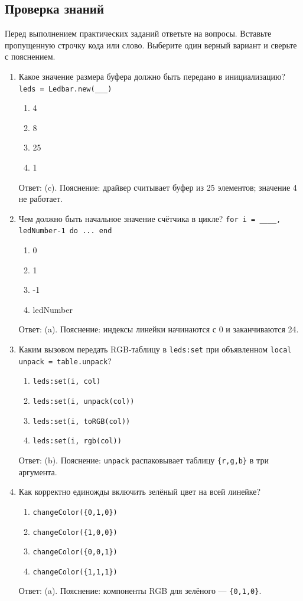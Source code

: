 \subsection{Проверка знаний}
Перед выполнением практических заданий ответьте на вопросы. Вставьте пропущенную строчку кода или слово. Выберите один верный вариант и сверьте с пояснением.
\begin{enumerate}
  \item Какое значение размера буфера должно быть передано в инициализацию? \verb|leds = Ledbar.new(___)|
  \begin{enumerate}[label=(\alph*)]
    \item 4 \item 8 \item 25 \item 1
  \end{enumerate}
  Ответ: (c). Пояснение: драйвер считывает буфер из 25 элементов; значение 4 не работает.

  \item Чем должно быть начальное значение счётчика в цикле? \verb|for i = ____, ledNumber-1 do ... end|
  \begin{enumerate}[label=(\alph*)]
    \item 0 \item 1 \item -1 \item ledNumber
  \end{enumerate}
  Ответ: (a). Пояснение: индексы линейки начинаются с 0 и заканчиваются 24.

  \item Каким вызовом передать RGB-таблицу в \verb|leds:set| при объявленном \verb|local unpack = table.unpack|?
  \begin{enumerate}[label=(\alph*)]
    \item \verb|leds:set(i, col)| \item \verb|leds:set(i, unpack(col))| \item \verb|leds:set(i, toRGB(col))| \item \verb|leds:set(i, rgb(col))|
  \end{enumerate}
  Ответ: (b). Пояснение: \verb|unpack| распаковывает таблицу \verb|{r,g,b}| в три аргумента.

  \item Как корректно единожды включить зелёный цвет на всей линейке?
  \begin{enumerate}[label=(\alph*)]
    \item \verb|changeColor({0,1,0})| \item \verb|changeColor({1,0,0})| \item \verb|changeColor({0,0,1})| \item \verb|changeColor({1,1,1})|
  \end{enumerate}
  Ответ: (a). Пояснение: компоненты RGB для зелёного — \verb|{0,1,0}|.


\end{enumerate}
